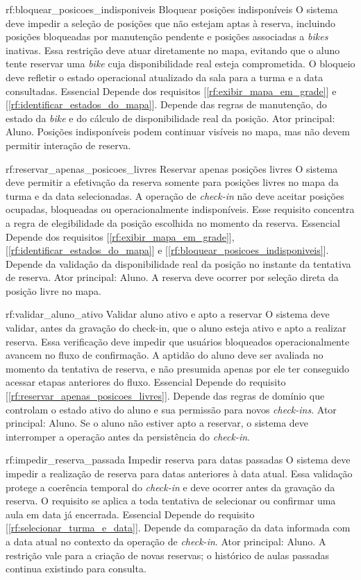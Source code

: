 \reqfuncfull
{rf:bloquear_posicoes_indisponiveis}
{Bloquear posições indisponíveis}
{O sistema deve impedir a seleção de posições que não estejam aptas à reserva, incluindo posições bloqueadas por manutenção pendente e posições associadas a \textit{bikes} inativas. Essa restrição deve atuar diretamente no mapa, evitando que o aluno tente reservar uma \textit{bike} cuja disponibilidade real esteja comprometida. O bloqueio deve refletir o estado operacional atualizado da sala para a turma e a data consultadas.}
{Essencial}
{Depende dos requisitos [\ref{rf:exibir_mapa_em_grade}] e [\ref{rf:identificar_estados_do_mapa}]. Depende das regras de manutenção, do estado da \textit{bike} e do cálculo de disponibilidade real da posição.}
{Ator principal: Aluno. Posições indisponíveis podem continuar visíveis no mapa, mas não devem permitir interação de reserva.}

\reqfuncfull
{rf:reservar_apenas_posicoes_livres}
{Reservar apenas posições livres}
{O sistema deve permitir a efetivação da reserva somente para posições livres no mapa da turma e da data selecionadas. A operação de \textit{check-in} não deve aceitar posições ocupadas, bloqueadas ou operacionalmente indisponíveis. Esse requisito concentra a regra de elegibilidade da posição escolhida no momento da reserva.}
{Essencial}
{Depende dos requisitos [\ref{rf:exibir_mapa_em_grade}], [\ref{rf:identificar_estados_do_mapa}] e [\ref{rf:bloquear_posicoes_indisponiveis}]. Depende da validação da disponibilidade real da posição no instante da tentativa de reserva.}
{Ator principal: Aluno. A reserva deve ocorrer por seleção direta da posição livre no mapa.}

\reqfuncfull
{rf:validar_aluno_ativo}
{Validar aluno ativo e apto a reservar}
{O sistema deve validar, antes da gravação do check-in, que o aluno esteja ativo e apto a realizar reserva. Essa verificação deve impedir que usuários bloqueados operacionalmente avancem no fluxo de confirmação. A aptidão do aluno deve ser avaliada no momento da tentativa de reserva, e não presumida apenas por ele ter conseguido acessar etapas anteriores do fluxo.}
{Essencial}
{Depende do requisito [\ref{rf:reservar_apenas_posicoes_livres}]. Depende das regras de domínio que controlam o estado ativo do aluno e sua permissão para novos \textit{check-ins}.}
{Ator principal: Aluno. Se o aluno não estiver apto a reservar, o sistema deve interromper a operação antes da persistência do \textit{check-in}.}

\reqfuncfull
{rf:impedir_reserva_passada}
{Impedir reserva para datas passadas}
{O sistema deve impedir a realização de reserva para datas anteriores à data atual. Essa validação protege a coerência temporal do \textit{check-in} e deve ocorrer antes da gravação da reserva. O requisito se aplica a toda tentativa de selecionar ou confirmar uma aula em data já encerrada.}
{Essencial}
{Depende do requisito [\ref{rf:selecionar_turma_e_data}]. Depende da comparação da data informada com a data atual no contexto da operação de \textit{check-in}.}
{Ator principal: Aluno. A restrição vale para a criação de novas reservas; o histórico de aulas passadas continua existindo para consulta.}

